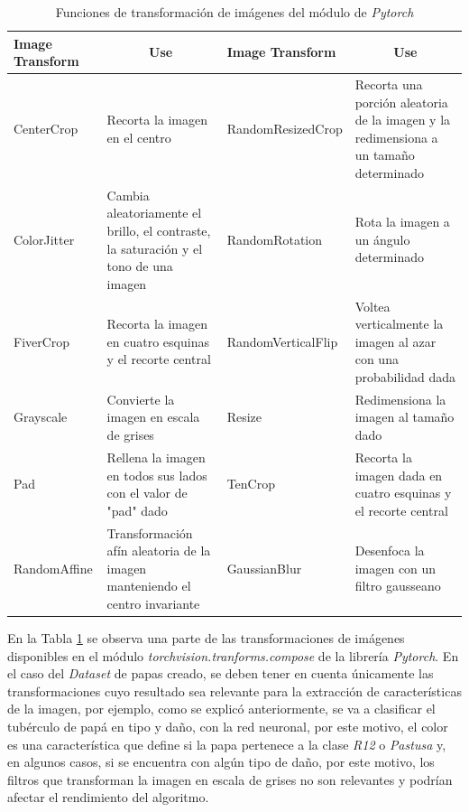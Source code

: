 \begin{table}[ht]
	\centering
	\begin{tabular}{|p{3cm}|p{4cm}|p{3.8cm}|p{4cm}|}
		\hline
		Image Transform       & \multicolumn{1}{c|}{Use}                                                               & Image Transform       & \multicolumn{1}{c|}{Use}                                                                        \\ \hline
		CenterCrop            & Recorta la imagen en el centro                                                         & RandomResizedCrop     & Recorta una porción aleatoria de la imagen y la redimensiona a un tamaño determinado            \\ \hline
		ColorJitter           & Cambia aleatoriamente el brillo, el contraste, la saturación y el tono de una imagen   & RandomRotation        & Rota la imagen a un ángulo determinado                                                          \\ \hline
		FiverCrop              & Recorta la imagen en cuatro esquinas y el recorte central                              & RandomVerticalFlip    & Voltea verticalmente la imagen al azar con una probabilidad dada                                \\ \hline
		Grayscale             & Convierte la imagen en escala de grises                                                & Resize                & Redimensiona la imagen al tamaño dado                                                           \\ \hline
		Pad                   & Rellena la imagen en todos sus lados con el valor de "pad" dado                        & TenCrop               & Recorta la imagen dada en cuatro esquinas y el recorte central \\ \hline
		RandomAffine          & Transformación afín aleatoria de la imagen manteniendo el centro invariante            & GaussianBlur          & Desenfoca la imagen con un filtro gausseano                                                                                                                     \\ \hline
	\end{tabular}
	\caption{Funciones de transformación de imágenes del módulo de \textit{Pytorch}}
	\label{table:Filters1}
\end{table}

En la Tabla \ref{table:Filters1} se observa una parte de las transformaciones de imágenes disponibles en el módulo \textit{torchvision.tranforms.compose} de la librería \textit{Pytorch}. En el caso del \textit{Dataset} de papas creado, se deben tener en cuenta únicamente las transformaciones cuyo resultado sea relevante para la extracción de características de la imagen, por ejemplo, como se explicó anteriormente, se va a clasificar el tubérculo de papá en tipo y daño, con la red neuronal, por este motivo, el color es una característica que define si la papa pertenece a la clase \textit{R12} o \textit{Pastusa} y, en algunos casos, si se encuentra con algún tipo de daño, por este motivo, los filtros que transforman la imagen en escala de grises no son relevantes y podrían afectar el rendimiento del algoritmo.

